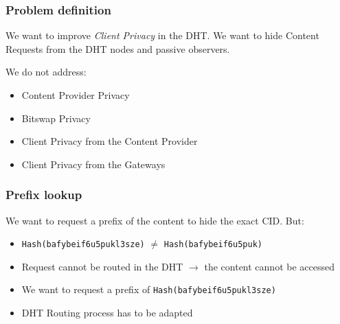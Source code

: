 \documentclass{pl-slide}
\begin{document}
\begin{frame}
\end{frame}
\fi

\begin{frame}
\frametitle{Problem definition}

We want to improve \textit{Client Privacy} in the DHT. We want to hide Content Requests from the DHT nodes and passive observers.

\vspace{2em}

We do not address:
\begin{itemize}
	\item Content Provider Privacy
	\item Bitswap Privacy
	\item Client Privacy from the Content Provider
	\item Client Privacy from the Gateways
\end{itemize}
\end{frame}

\begin{frame}
\frametitle{Prefix lookup}
We want to request a prefix of the content to hide the exact CID. But:
\begin{itemize}
	\item \texttt{Hash(bafybeif6u5pukl3sze)} $\neq$ \texttt{Hash(bafybeif6u5puk)}
	\item Request cannot be routed in the DHT $\rightarrow$ the content cannot be accessed
	\item We want to request a prefix of \texttt{Hash(bafybeif6u5pukl3sze)}
	\item DHT Routing process has to be adapted
\end{itemize}

\end{frame}
\end{document}
